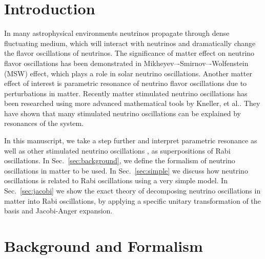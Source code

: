 \documentclass[%
reprint,
 amsmath,amssymb,
 aps,
]{revtex4-1}
\begin{document}
\maketitle


\section{\label{introduction}Introduction}

In many astrophysical environments neutrinos propagate through dense fluctuating medium, which will interact with neutrinos and dramatically change the flavor oscillations of neutrinos. The significance of matter effect on neutrino flavor oscillations has been demonstrated in Mikheyev–-Smirnov–-Wolfenstein (MSW) effect, which plays a role in solar neutrino oscillations.\cite{wolf78} Another matter effect of interest is parametric resonance of neutrino flavor oscillations due to perturbations in matter.\cite{Krastev1989} Recently matter stimulated neutrino oscillations has been researched using more advanced mathematical tools by Kneller, et al..\cite{Kneller2013,Patton2014} They have shown that many stimulated neutrino oscillations can be explained by resonances of the system. 

In this manuscript, we take a step further and interpret parametric resonance \cite{Akhmedov2000, Krastev1989} as well as other stimulated neutrino oscillations \cite{Kneller2013, Patton2014}, as superpositions of Rabi oscillations. In Sec.~\ref{sec:background}, we define the formalism of neutrino oscillations in matter to be used. In Sec.~\ref{sec:simple} we discuss how neutrino oscillations is related to Rabi oscillations using a very simple model. In Sec.~\ref{sec:jacobi} we show the exact theory of decomposing neutrino oscillations in matter into Rabi oscillations, by applying a specific unitary transformation of the basis and Jacobi-Anger expansion.

\section{\label{sec:background}Background and Formalism}
\end{document}

